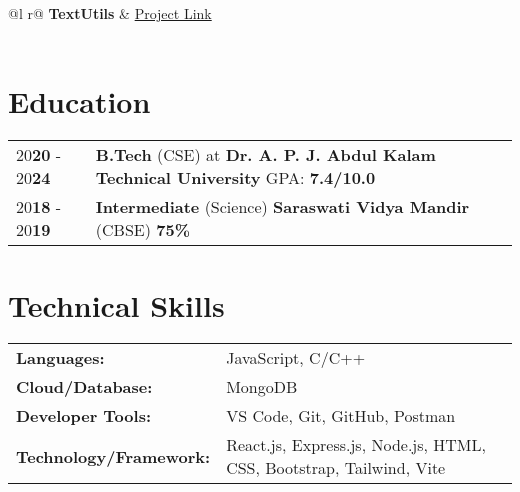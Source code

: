 \documentclass[a4paper,12pt]{article}
\begin{document}
\begin{tabularx}{\linewidth}{ @{}l r@{} }
\textbf{TextUtils} & \hfill \href{https://github.com/AshutoshSingh2021/my-First-react-app}{Project Link} \\[2.00pt]
  \\
\end{tabularx}
\section{Education}
\begin{tabularx}{\linewidth}{@{}l X@{}}	
20\textbf{20} - 20\textbf{24} & \textbf{B.Tech} (CSE) at \textbf{Dr. A. P. J. Abdul Kalam Technical University} \hfill \normalsize GPA: \textbf{7.4/10.0} \\
20\textbf{18} - 20\textbf{19} & \textbf{Intermediate} (Science) \textbf{Saraswati Vidya Mandir} (CBSE) \hfill  \textbf{75\%} \\

\end{tabularx}

\section{Technical Skills}
\begin{tabularx}{\linewidth}{@{}l X@{}}
\textbf{Languages: } &  \normalsize{JavaScript, C/C++}\\
\textbf{Cloud/Database: }  &  \normalsize{MongoDB}\\
\textbf{Developer Tools: }  &  \normalsize{VS Code, Git, GitHub, Postman}\\
\textbf{Technology/Framework: }  &  \normalsize{React.js, Express.js, Node.js, HTML, CSS, Bootstrap, Tailwind, Vite}\\
\end{tabularx}
\end{document}
